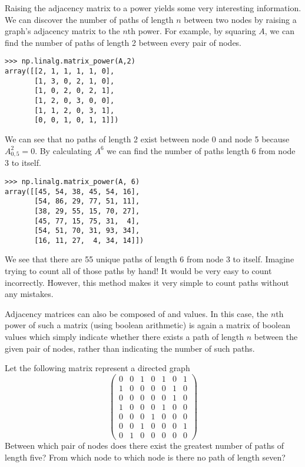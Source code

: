 Raising the adjacency matrix to a power yields some very interesting information.
We can discover the number of paths of length $n$ between two nodes by raising a graph's adjacency matrix to the $n$th power.
For example, by squaring $A$, we can find the number of paths of length 2 between every pair of nodes.
\begin{lstlisting}
>>> np.linalg.matrix_power(A,2)
array([[2, 1, 1, 1, 1, 0],
       [1, 3, 0, 2, 1, 0],
       [1, 0, 2, 0, 2, 1],
       [1, 2, 0, 3, 0, 0],
       [1, 1, 2, 0, 3, 1],
       [0, 0, 1, 0, 1, 1]])
\end{lstlisting}
We can see that no paths of length 2 exist between node 0 and node 5 because $A^2_{0,5} = 0$.
By calculating $A^6$ we can find the number of paths length 6 from node 3 to itself.
\begin{lstlisting}
>>> np.linalg.matrix_power(A, 6)
array([[45, 54, 38, 45, 54, 16],
       [54, 86, 29, 77, 51, 11],
       [38, 29, 55, 15, 70, 27],
       [45, 77, 15, 75, 31,  4],
       [54, 51, 70, 31, 93, 34],
       [16, 11, 27,  4, 34, 14]])
\end{lstlisting}
We see that there are 55 unique paths of length 6 from node 3 to itself.
Imagine trying to count all of those paths by hand!
It would be very easy to count incorrectly.
However, this method makes it very simple to count paths without any mistakes.

Adjacency matrices can also be composed of  and  values.
In this case, the $n$th power of such a matrix (using boolean arithmetic)
is again a matrix of
boolean values which simply indicate whether there exists a path of length $n$ between the given pair of nodes, rather than indicating the number of such
paths.

\begin{problem}
Let the following matrix represent a directed graph
\[
\begin{pmatrix}
0 & 0 & 1 & 0 & 1 & 0 & 1 \\
1 & 0 & 0 & 0 & 0 & 1 & 0 \\
0 & 0 & 0 & 0 & 0 & 1 & 0 \\
1 & 0 & 0 & 0 & 1 & 0 & 0 \\
0 & 0 & 0 & 1 & 0 & 0 & 0 \\
0 & 0 & 1 & 0 & 0 & 0 & 1 \\
0 & 1 & 0 & 0 & 0 & 0 & 0
\end{pmatrix}
\]
Between which pair of nodes does there exist the greatest number of paths
of length five?
From which node to which node is there no path of length seven?
\end{problem}

